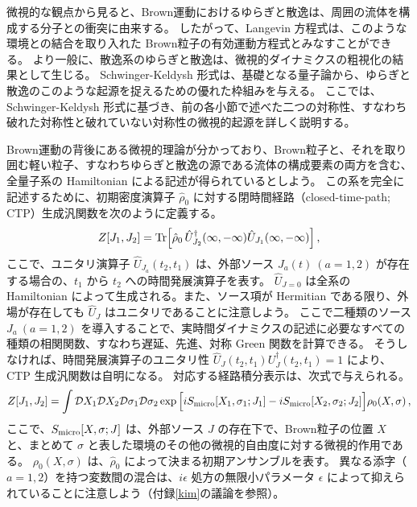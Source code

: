 \label{micro:origin}

微視的な観点から見ると、Brown運動におけるゆらぎと散逸は、周囲の流体を構成する分子との衝突に由来する。
したがって、Langevin 方程式は、このような環境との結合を取り入れた Brown粒子の有効運動方程式とみなすことができる。
より一般に、散逸系のゆらぎと散逸は、微視的ダイナミクスの粗視化の結果として生じる。
Schwinger-Keldysh 形式は、基礎となる量子論から、ゆらぎと散逸のこのような起源を捉えるための優れた枠組みを与える。
ここでは、Schwinger-Keldysh 形式に基づき、前の各小節で述べた二つの対称性、すなわち破れた対称性と破れていない対称性の微視的起源を詳しく説明する。

\medskip
Brown運動の背後にある微視的理論が分かっており、Brown粒子と、それを取り囲む軽い粒子、すなわちゆらぎと散逸の源である流体の構成要素の両方を含む、全量子系の Hamiltonian による記述が得られているとしよう。
この系を完全に記述するために、初期密度演算子 $\hat{\rho}_0$ に対する閉時間経路（closed-time-path; CTP）生成汎関数を次のように定義する。
\begin{align}
 Z[J_1, J_2] 
 = 
 {\rm Tr} \Big[\hat{\rho}_0 \,
 \hat{U}_{J_2}^\dagger(\infty,-\infty)
 \hat{U}_{J_1} (\infty,-\infty) \Big]\,, 
 \label{partition}
\end{align}
ここで、ユニタリ演算子 $\hat{U}_{J_{a}}(t_2, t_1)$ は、外部ソース $J_a(t)~(a=1,2)$ が存在する場合の、$t_1$ から $t_2$ への時間発展演算子を表す。
$\hat{U}_{J=0}$ は全系の Hamiltonian によって生成される。また、ソース項が Hermitian である限り、外場が存在しても $\hat{U}_J$ はユニタリであることに注意しよう。
ここで二種類のソース $J_a~(a=1,2)$ を導入することで、実時間ダイナミクスの記述に必要なすべての種類の相関関数、すなわち遅延、先進、対称 Green 関数を計算できる。
そうしなければ、時間発展演算子のユニタリ性 $\hat{U}_{J} (t_2,t_1) U_{J}^\dagger(t_2,t_1) = 1$ により、CTP 生成汎関数は自明になる。
対応する経路積分表示は、次式で与えられる。
\begin{align}
 Z[J_1,J_2]
 =\int \mathcal{D} X_1 \mathcal{D} X_2
 \mathcal{D} \sigma_1 \mathcal{D} \sigma_2
 \exp 
 \Big[iS_{\rm micro}[X_1,\sigma_1;J_1]-iS_{\rm micro}[X_2,\sigma_2;J_2] \Big]  
 \rho_0 (X,\sigma) \label{pi_micro}  \,,
\end{align}
ここで、$S_{\rm micro}[X,\sigma;J]$ は、外部ソース $J$ の存在下で、Brown粒子の位置 $X$ と、まとめて $\sigma$ と表した環境のその他の微視的自由度に対する微視的作用である。
$\rho_0 (X,\sigma)$ は、$\hat{\rho}_0$ によって決まる初期アンサンブルを表す。
異なる添字（$a=1,2$）を持つ変数間の混合は、$i\epsilon$ 処方の無限小パラメータ $\epsilon$ によって抑えられていることに注意しよう（付録\ref{kim}の議論を参照）。
